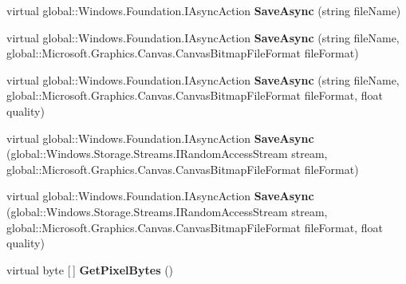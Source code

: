 \begin{DoxyCompactItemize}
virtual global\+::\+Windows.\+Foundation.\+I\+Async\+Action {\bfseries Save\+Async} (string file\+Name)
\item 
\mbox{\label{class_microsoft_1_1_graphics_1_1_canvas_1_1_canvas_bitmap_a71b893fc3d24247089f700a987cf40f4}} 
virtual global\+::\+Windows.\+Foundation.\+I\+Async\+Action {\bfseries Save\+Async} (string file\+Name, global\+::\+Microsoft.\+Graphics.\+Canvas.\+Canvas\+Bitmap\+File\+Format file\+Format)
\item 
\mbox{\label{class_microsoft_1_1_graphics_1_1_canvas_1_1_canvas_bitmap_a5a0c3c8cf1b9497e868fa4f4b7e9eef9}} 
virtual global\+::\+Windows.\+Foundation.\+I\+Async\+Action {\bfseries Save\+Async} (string file\+Name, global\+::\+Microsoft.\+Graphics.\+Canvas.\+Canvas\+Bitmap\+File\+Format file\+Format, float quality)
\item 
\mbox{\label{class_microsoft_1_1_graphics_1_1_canvas_1_1_canvas_bitmap_a97f07e6d4d92c4bf04161c9dbe9d4d43}} 
virtual global\+::\+Windows.\+Foundation.\+I\+Async\+Action {\bfseries Save\+Async} (global\+::\+Windows.\+Storage.\+Streams.\+I\+Random\+Access\+Stream stream, global\+::\+Microsoft.\+Graphics.\+Canvas.\+Canvas\+Bitmap\+File\+Format file\+Format)
\item 
\mbox{\label{class_microsoft_1_1_graphics_1_1_canvas_1_1_canvas_bitmap_a12dbcce2c5537fdd1327774568779aeb}} 
virtual global\+::\+Windows.\+Foundation.\+I\+Async\+Action {\bfseries Save\+Async} (global\+::\+Windows.\+Storage.\+Streams.\+I\+Random\+Access\+Stream stream, global\+::\+Microsoft.\+Graphics.\+Canvas.\+Canvas\+Bitmap\+File\+Format file\+Format, float quality)
\item 
\mbox{\label{class_microsoft_1_1_graphics_1_1_canvas_1_1_canvas_bitmap_a5439276ff136016e39649b670b53d85e}} 
virtual byte \mbox{[}$\,$\mbox{]} {\bfseries Get\+Pixel\+Bytes} ()
\item 
\mbox{\label{class_microsoft_1_1_graphics_1_1_canvas_1_1_canvas_bitmap_ab2657a59b4565b0c1a0e3577ab555f84}} 

\end{DoxyCompactItemize}
